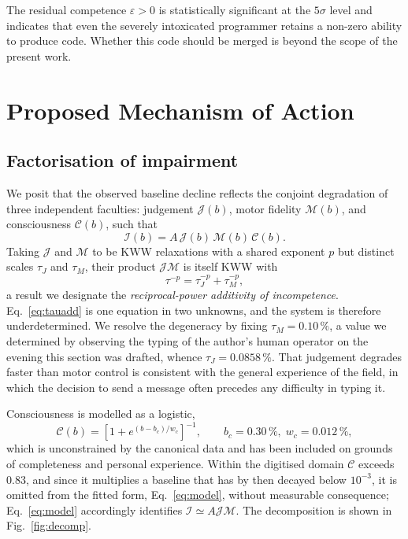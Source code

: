 \documentclass[11pt]{article}
\newcommand{\J}{\mathcal{J}}
\newcommand{\M}{\mathcal{M}}
\newcommand{\C}{\mathcal{C}}
\newcommand{\Imp}{\mathcal{I}}
\newcommand{\pct}{\,\%}
\begin{document}
The residual competence $\varepsilon > 0$ is statistically significant at the $5\sigma$ level and indicates that even the severely intoxicated programmer retains a non-zero ability to produce code. Whether this code should be merged is beyond the scope of the present work.

\section{Proposed Mechanism of Action}

\subsection{Factorisation of impairment}

We posit that the observed baseline decline reflects the conjoint degradation of three independent faculties: judgement $\J(b)$, motor fidelity $\M(b)$, and consciousness $\C(b)$, such that
\begin{equation}
\Imp(b) = A\,\J(b)\,\M(b)\,\C(b).
\label{eq:factor}
\end{equation}
Taking $\J$ and $\M$ to be KWW relaxations with a shared exponent $p$ but distinct scales $\tau_J$ and $\tau_M$, their product $\J\M$ is itself KWW with
\begin{equation}
\tau^{-p} = \tau_J^{-p} + \tau_M^{-p},
\label{eq:tauadd}
\end{equation}
a result we designate the \emph{reciprocal-power additivity of incompetence}. Eq.~\eqref{eq:tauadd} is one equation in two unknowns, and the system is therefore underdetermined. We resolve the degeneracy by fixing $\tau_M = 0.10\pct$, a value we determined by observing the typing of the author's human operator on the evening this section was drafted, whence $\tau_J = 0.0858\pct$. That judgement degrades faster than motor control is consistent with the general experience of the field, in which the decision to send a message often precedes any difficulty in typing it.

Consciousness is modelled as a logistic,
\begin{equation}
\C(b) = \left[1 + e^{(b - b_c)/w_c}\right]^{-1}, \qquad b_c = 0.30\pct,\; w_c = 0.012\pct,
\end{equation}
which is unconstrained by the canonical data and has been included on grounds of completeness and personal experience. Within the digitised domain $\C$ exceeds $0.83$, and since it multiplies a baseline that has by then decayed below $10^{-3}$, it is omitted from the fitted form, Eq.~\eqref{eq:model}, without measurable consequence; Eq.~\eqref{eq:model} accordingly identifies $\Imp \simeq A\J\M$. The decomposition is shown in Fig.~\ref{fig:decomp}.
\end{document}
